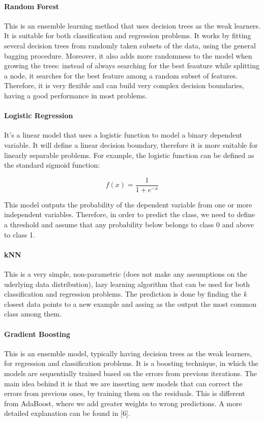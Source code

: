 \documentclass[11pt]{article}
\begin{document}
\paragraph{Random Forest} This is an ensemble learning method that uses decision trees as the weak learners. It is suitable for both classification and regression problems. It works by fitting several decision trees from randomly taken subsets of the data, using the general bagging procedure. Moreover, it also adds more randomness to the model when growing the trees: instead of always searching for the best feauture while splitting a node, it searches for the best feature among a random subset of features. Therefore, it is very flexible and can build very complex decision boundaries, having a good performance in most problems.

\paragraph{Logistic Regression} It's a linear model that uses a logistic function to model a binary dependent variable. It will define a linear decision boundary, therefore it is more suitable for linearly separable problems. For example, the logistic function can be defined as the standard sigmoid function:

\begin{equation}
f(x) = \frac{1}{1 + e^{-x}}
\end{equation}

This model outputs the probability of the dependent variable from one or more independent variables. Therefore, in order to predict the class, we need to define a threshold and assume that any probability below belongs to class 0 and above to class 1. 

\paragraph{kNN} This is a very simple, non-parametric (does not make any assumptions on the uderlying data distribution), lazy learning algorithm that can be used for both classification and regression problems. The prediction is done by finding the \textit{k} closest data points to a new example and assing as the output the most common class among them. 

\paragraph{Gradient Boosting} This is an ensemble model, typically having decision trees as the weak learners, for regression and classification problems. It is a boosting technique, in which the models are sequentially trained based on the errors from previous iterations. The main idea behind it is that we are inserting new models that can correct the errors from previous ones, by training them on the residuals. This is different from AdaBoost, where we add greater weights to wrong predictions. A more detailed explanation can be found in [6].
\end{document}
